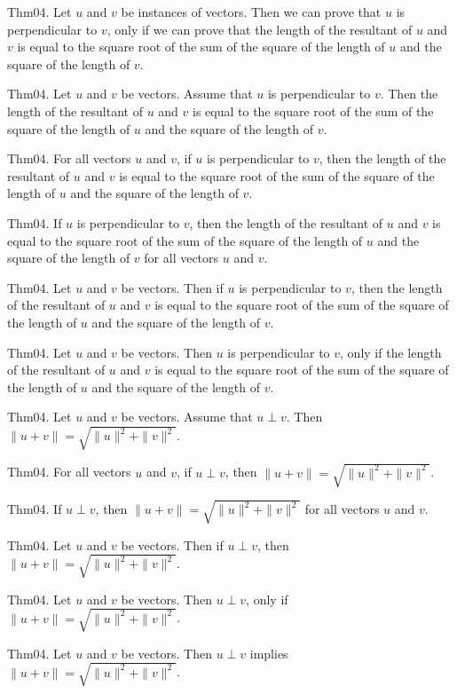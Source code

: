 \documentclass{article}
\begin{document}
Thm04. Let $u$ and $v$ be instances of vectors. Then we can prove that $u$ is perpendicular to $v$, only if we can prove that the length of the resultant of $u$ and $v$ is equal to the square root of the sum of the square of the length of $u$ and the square of the length of $v$.

Thm04. Let $u$ and $v$ be vectors. Assume that $u$ is perpendicular to $v$. Then the length of the resultant of $u$ and $v$ is equal to the square root of the sum of the square of the length of $u$ and the square of the length of $v$.

Thm04. For all vectors $u$ and $v$, if $u$ is perpendicular to $v$, then the length of the resultant of $u$ and $v$ is equal to the square root of the sum of the square of the length of $u$ and the square of the length of $v$.

Thm04. If $u$ is perpendicular to $v$, then the length of the resultant of $u$ and $v$ is equal to the square root of the sum of the square of the length of $u$ and the square of the length of $v$ for all vectors $u$ and $v$.

Thm04. Let $u$ and $v$ be vectors. Then if $u$ is perpendicular to $v$, then the length of the resultant of $u$ and $v$ is equal to the square root of the sum of the square of the length of $u$ and the square of the length of $v$.

Thm04. Let $u$ and $v$ be vectors. Then $u$ is perpendicular to $v$, only if the length of the resultant of $u$ and $v$ is equal to the square root of the sum of the square of the length of $u$ and the square of the length of $v$.

Thm04. Let $u$ and $v$ be vectors. Assume that $u \perp v$. Then $\| u + v \| = \sqrt{ \| u \| ^{ 2}+ \| v \| ^{ 2}}$.

Thm04. For all vectors $u$ and $v$, if $u \perp v$, then $\| u + v \| = \sqrt{ \| u \| ^{ 2}+ \| v \| ^{ 2}}$.

Thm04. If $u \perp v$, then $\| u + v \| = \sqrt{ \| u \| ^{ 2}+ \| v \| ^{ 2}}$ for all vectors $u$ and $v$.

Thm04. Let $u$ and $v$ be vectors. Then if $u \perp v$, then $\| u + v \| = \sqrt{ \| u \| ^{ 2}+ \| v \| ^{ 2}}$.

Thm04. Let $u$ and $v$ be vectors. Then $u \perp v$, only if $\| u + v \| = \sqrt{ \| u \| ^{ 2}+ \| v \| ^{ 2}}$.

Thm04. Let $u$ and $v$ be vectors. Then $u \perp v$ implies $\| u + v \| = \sqrt{ \| u \| ^{ 2}+ \| v \| ^{ 2}}$.
\end{document}
